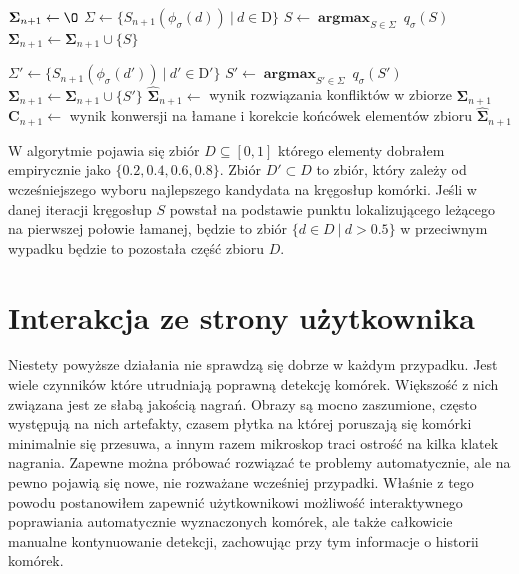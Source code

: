 \documentclass[declaration,shortabstract,mgr]{iithesis}
\DeclareMathOperator*{\argmax}{\textbf{argmax}}
\begin{document}
\begin{algorithm}[H]
\begin{algorithmic}

  \STATE $\mathbf{\Sigma}_{n+1} \gets \O$
    \STATE $\Sigma \gets \{ S_{n+1}(\phi_\sigma(d)) \ | \ d \in \text{D} \}$
    \STATE $S \gets \argmax_{S \in \Sigma} \ q_\sigma(S)$
    \STATE $\mathbf{\Sigma}_{n+1} \gets \mathbf{\Sigma}_{n+1} \cup \{ S \}$
    
      \STATE $\Sigma' \gets \{ S_{n+1}(\phi_\sigma(d')) \ | \ d' \in \text{D}' \}$
      \STATE $S' \gets \argmax_{S' \in \Sigma} \ q_\sigma(S')$
      \STATE $\mathbf{\Sigma}_{n+1} \gets \mathbf{\Sigma}_{n+1} \cup \{ S' \}$
    \ENDIF
  \ENDFOR
  \STATE $\mathbf{\hat{\Sigma}}_{n+1} \gets$ wynik rozwiązania konfliktów w zbiorze $\mathbf{\Sigma}_{n+1}$
  \STATE $\mathbf{C}_{n+1} \gets$ wynik konwersji na łamane i korekcie końcówek elementów zbioru $\mathbf{\hat{\Sigma}}_{n+1}$
\ENDFOR

\end{algorithmic}
\end{algorithm}

\noindent
W algorytmie pojawia się zbiór $D \subseteq [0, 1]$ którego elementy dobrałem empirycznie jako $\{ 0.2, 0.4, 0.6, 0.8 \}$.
Zbiór $D' \subset D$ to zbiór, który zależy od wcześniejszego wyboru najlepszego kandydata na kręgosłup komórki. Jeśli w danej iteracji kręgosłup $S$ powstał na podstawie punktu lokalizującego leżącego na pierwszej połowie łamanej, będzie to zbiór $\{ d \in D \ | \ d > 0.5 \}$ w przeciwnym wypadku będzie to pozostała część zbioru $D$.

\section{Interakcja ze strony użytkownika}

Niestety powyższe działania nie sprawdzą się dobrze w każdym przypadku.
Jest wiele czynników które utrudniają poprawną detekcję komórek.
Większość z nich związana jest ze słabą jakością nagrań.
Obrazy są mocno zaszumione, często występują na nich artefakty, czasem płytka na której poruszają się komórki minimalnie się przesuwa, a innym razem mikroskop traci ostrość na kilka klatek nagrania.
Zapewne można próbować rozwiązać te problemy automatycznie, ale na pewno pojawią się nowe, nie rozważane wcześniej przypadki.
Właśnie z tego powodu postanowiłem zapewnić użytkownikowi możliwość interaktywnego poprawiania automatycznie wyznaczonych komórek, ale także całkowicie manualne kontynuowanie detekcji, zachowując przy tym informacje o historii komórek.
\end{document}
